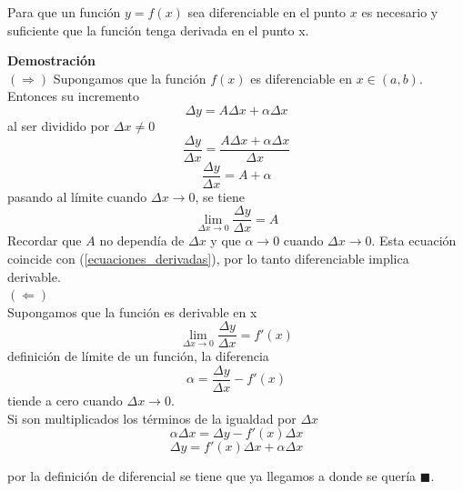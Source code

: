 \documentclass[10pt,twoside]{SelfArx} %
\begin{document}
\begin{teorema}
	Para que un función $ y=f(x) $ sea diferenciable en el punto $ x $ es necesario y suficiente que la función tenga derivada en el punto x.
\end{teorema}
\textbf{  Demostraci\'on}\\
$ (\Rightarrow) $
Supongamos que la funci\'on $ f(x) $ es diferenciable en $ x\in(a,b) $. Entonces su incremento 
\[  	\Delta y=A\Delta x+\alpha\Delta x  \]
al ser dividido por $ \Delta x\neq0 $
\begin{equation}
	\dfrac{\Delta y}{\Delta x}=\dfrac{A\Delta x+\alpha\Delta x}{\Delta x}
\end{equation}
\begin{equation}
\dfrac{\Delta y}{\Delta x}=A+\alpha
\end{equation}
pasando al límite cuando $ \Delta x\rightarrow0 $, se tiene
\begin{equation}
\lim\limits_{\Delta x\rightarrow0}\dfrac{\Delta y}{\Delta x}=A
\end{equation}
Recordar que $ A $ no dependía de $ \Delta x $ y que $ \alpha\rightarrow0 $ cuando $ \Delta x\rightarrow0 $. Esta ecuación coincide con (\ref{ecuaciones_derivadas}), por lo tanto diferenciable implica derivable.\\
$ (\Leftarrow) $\\
  Supongamos que la función es derivable en x
\begin{equation}
  \lim\limits_{\Delta x\rightarrow0}\dfrac{\Delta y}{\Delta x}=f'(x)
\end{equation}
 definici\'on de l\'imite de un funci\'on, la diferencia
 \begin{equation}
 \alpha=\dfrac{\Delta y}{\Delta x}-f'(x)
 \end{equation}  
 tiende a cero cuando $ \Delta x\rightarrow0 $.\\
 Si son multiplicados los t\'erminos de la igualdad por $ \Delta x $
 \begin{equation}
 \alpha\Delta x=\Delta y-f'(x)\Delta x
 \end{equation}
  \begin{equation}
  \Delta y=f'(x)\Delta x+\alpha\Delta x
  \end{equation}
  
  por la definici\'on de diferencial se tiene que ya llegamos a donde se quer\'ia $ \blacksquare $.\\
  \begin{center}
 \end{center}
  
\end{document}
